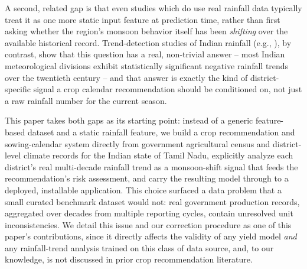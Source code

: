 \documentclass[conference]{IEEEtran}
\begin{document}
A second, related gap is that even studies which do use real rainfall data typically
treat it as one more static input feature at prediction time, rather than first asking
whether the region's monsoon behavior itself has been \emph{shifting} over the
available historical record. Trend-detection studies of Indian rainfall (e.g.,
\cite{praveen2020}), by contrast, show that this question has a real, non-trivial
answer -- most Indian meteorological divisions exhibit statistically significant
negative rainfall trends over the twentieth century -- and that answer is exactly the
kind of district-specific signal a crop calendar recommendation should be conditioned
on, not just a raw rainfall number for the current season.

This paper takes both gaps as its starting point: instead of a generic feature-based
dataset and a static rainfall feature, we build a crop recommendation and
sowing-calendar system directly from government agricultural census and
district-level climate records for the Indian state of Tamil Nadu, explicitly analyze
each district's real multi-decade rainfall trend as a monsoon-shift signal that feeds
the recommendation's risk assessment, and carry the resulting model through to a
deployed, installable application. This choice surfaced a data problem that a small
curated benchmark dataset would not: real government production records, aggregated
over decades from multiple reporting cycles, contain unresolved unit inconsistencies.
We detail this issue and our correction procedure as one of this paper's
contributions, since it directly affects the validity of any yield model \emph{and}
any rainfall-trend analysis trained on this class of data source, and, to our
knowledge, is not discussed in prior crop recommendation literature.
\end{document}
